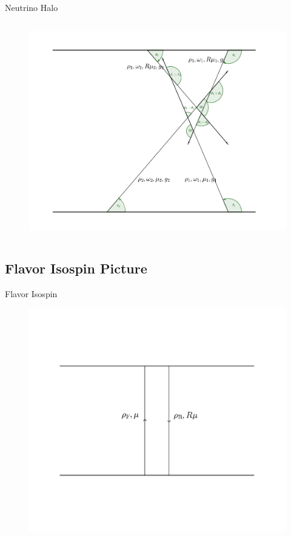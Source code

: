 \begin{frame}{Neutrino Halo}
{\begin{columns}[T]
   \begin{column}{0.5\textwidth}
      \begin{figure}
         \includegraphics[width=\textwidth]{assets/halo-line-model}
      \end{figure}
   \end{column}
\end{columns}


}

\end{frame}

\subsection{Flavor Isospin Picture}

\begin{frame}{Flavor Isospin}


\begin{figure}
   \includegraphics[width=\textwidth]{assets/halo-line-model-single-beam}
\end{figure}


\end{frame}



